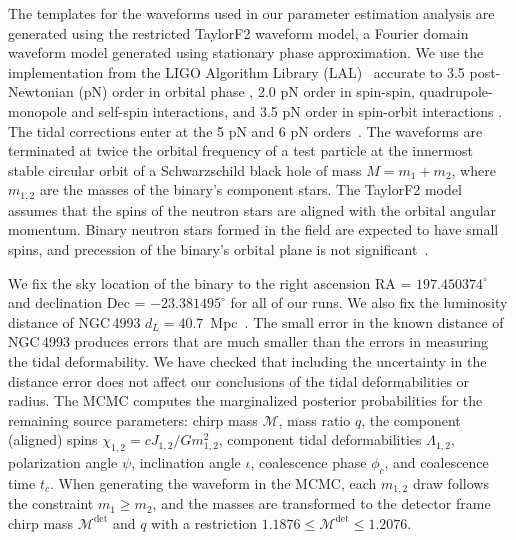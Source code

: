 The templates for the waveforms used in our parameter estimation analysis are generated using the restricted TaylorF2 waveform model, a Fourier domain waveform model generated using stationary phase approximation. We use the implementation from the LIGO Algorithm Library (LAL)~\cite{lal} accurate to 3.5 post-Newtonian (pN) order in orbital phase \cite{Buonanno:2009zt}, 2.0 pN order in spin-spin, quadrupole-monopole and self-spin interactions\cite{Arun:2008kb,Mikoczi:2005dn}, and 3.5 pN order in spin-orbit interactions \cite{Bohe:2013cla}. The tidal corrections enter at the 5 pN and 6 pN orders~\cite{Vines:2011ud}. The waveforms are terminated at twice the orbital frequency of a test particle at the innermost stable circular orbit of a Schwarzschild black hole of mass $M = m_1 + m_2$, where $m_{1,2}$ are the masses of the binary's component stars. The TaylorF2 model assumes that the spins of the neutron stars are aligned with the orbital angular momentum. Binary neutron stars formed in the field are expected to have small spins, and precession of the binary's orbital plane is not significant~\cite{Brown:2012qf}. 

We fix the sky location of the binary to the right ascension RA =  $197.450374^\circ$ and declination Dec = $-23.381495^\circ$ \cite{Soares-Santos:2017lru} for all of our runs. We also fix the luminosity distance of NGC\,4993 $d_L = 40.7$~Mpc~\cite{Cantiello:2018ffy}. The small error in the known distance of NGC\,4993 produces errors that are much smaller than the errors in measuring the tidal deformability. We have checked that including the uncertainty in the distance error does not affect our conclusions of the tidal deformabilities or radius. The MCMC computes the marginalized posterior probabilities for the remaining source parameters: chirp mass $\mathcal{M}$, mass ratio $q$, the component (aligned) spins $\chi_{1,2} = c J_{1,2}/G m_{1,2}^2$, component tidal deformabilities $\Lambda_{1,2}$, polarization angle $\psi$, inclination angle $\iota$, coalescence phase $\phi_c$, and coalescence time $t_c$. When generating the waveform in the MCMC, each $m_{1, 2}$ draw follows the constraint $m_1 \geq m_2$, and the masses are transformed to the detector frame chirp mass $\mathcal{M}^\mathrm{det}$ and $q$ with a restriction $1.1876 \le \mathcal{M}^\mathrm{det} \le 1.2076$.

